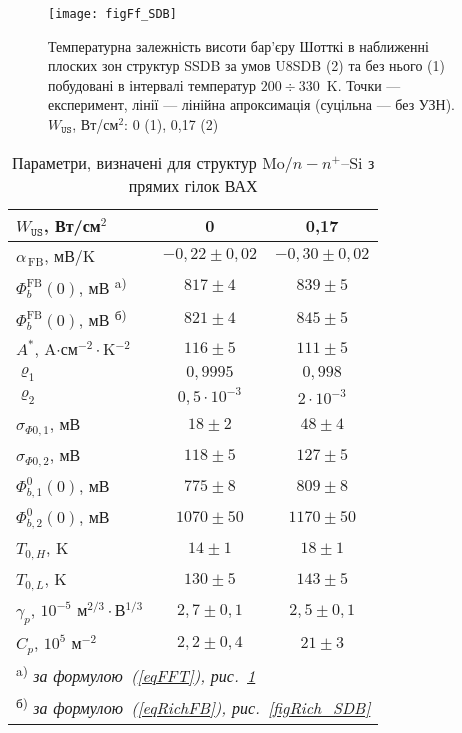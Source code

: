 \begin{figure}
\center
\texttt{[image: figFf\_SDB]}
\caption{\label{figFf_SDB}
Температурна залежність висоти бар'єру Шотткі в наближенні плоских зон
структур SSDB за умов U8SDB (2) та без нього (1) побудовані в інтервалі
температур $200\div330$~K.
Точки --- експеримент, лінії --- лінійна апроксимація (суцільна --- без УЗН).
$W_\mathtt{US}$,  Вт/см$^2$: 0 (1), 0,17 (2)
}%
\end{figure}


\begin{table}
\caption{Параметри, визначені для структур Mo$/n-n^+$--Si з прямих гілок ВАХ}
\label{tabSDBPar}
\centering
\begin{tabular}{|l|c|c|}
\hline
$W_\mathtt{US}$,  Вт/см$^2$ &0&0,17\\\hline
\hline
$\alpha_\mathrm{\,FB}$, мВ/K &$-0,22\pm0,02$&$-0,30\pm0,02$\\\hline
$\Phi_{b}^\mathrm{FB}(0)$, мВ \textsuperscript{ a)} &$817\pm4$ & $839\pm5$\\\hline
$\Phi_{b}^\mathrm{FB}(0)$, мВ \textsuperscript{ б)} &$821\pm4$ & $845\pm5$\\\hline
$A^*$, A$\cdot$см$^{-2}\cdot$K$^{-2}$ &$116\pm5$ & $111\pm5$\\\hline
$\varrho_1$ &$0,9995$ & $0,998$\\\hline
$\varrho_2$ &$0,5\cdot10^{-3}$ & $2\cdot10^{-3}$\\\hline
$\sigma_{\Phi0,1}$, мВ&$18\pm2$ & $48\pm4$\\\hline
$\sigma_{\Phi0,2}$, мВ&$118\pm5$ & $127\pm5$\\\hline
$\Phi_{b,1}^0(0)$, мВ&$775\pm8$ & $809\pm8$\\\hline
$\Phi_{b,2}^0(0)$, мВ&$1070\pm50$ & $1170\pm50$\\\hline
$T_{0,H}$, K&$14\pm1$&$18\pm1$\\\hline
$T_{0,L}$, K&$130\pm5$&$143\pm5$\\\hline
$\gamma_p$, $10^{-5}$ м$^{2/3}\cdot$В$^{1/3}$&$2,7\pm0,1$&$2,5\pm0,1$\\\hline
$C_p$, $10^{5}$ м$^{-2}$&$2,2\pm0,4$&$21\pm3$\\ \hline
\multicolumn{3}{l}{\textsuperscript{ a)} \emph{за формулою~(\ref{eqFFT}), рис.~\ref{figFf_SDB} }}  \\
\multicolumn{3}{l}{\textsuperscript{ б)} \emph{за формулою~(\ref{eqRichFB}), рис.~\ref{figRich_SDB} }} \\
\end{tabular}
\end{table}

